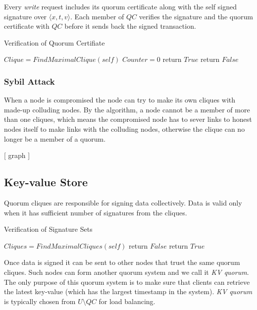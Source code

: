 Every {\em write} request includes its quorum certificate along with the
self signed signature over $\langle x, t, v \rangle$. Each member of
$QC$ verifies the signature and the quorum certificate with $QC$
before it sends back the signed transaction.

\begin{algorithm}
  \caption{Verification of Quorum Certifiate}
  \SetAlgoNoLine
  $Clique = FindMaximalClique(self)$\;
  $Counter = 0$\;
  {
  }
  {
    return $True$\;
  }{
    return $False$\;
  }
\end{algorithm}

\subsubsection*{Sybil Attack}
When a node is compromised the node can try to make its own cliques
with made-up colluding nodes. By the algorithm, a node cannot be a
member of more than one cliques, which means the compromised node has
to sever links to honest nodes itself to make links with the colluding
nodes, otherwise the clique can no longer be a member of a quorum.

[ graph ]

\subsection{Key-value Store}
Quorum cliques are responsible for signing data collectively. Data is
valid only when it has sufficient number of signatures from the
cliques. 

\begin{algorithm}
  \caption{Verification of Signature Sets}
  \SetAlgoNoLine
  $Cliques = FindMaximalCliques(self)$\;
  {
    {
      return $False$\;
    }
  }
  return $True$\;
\end{algorithm}

Once data is signed it can be sent to other nodes that trust the same
quorum cliques. Such nodes can form another quorum system and we call
it {\em KV quorum}. The only purpose of this quorum system is to make
sure that clients can retrieve the latest key-value (which has the
largest timestamp in the system). {\em KV quorum} is typically chosen
from $U \setminus QC$ for load balancing.

